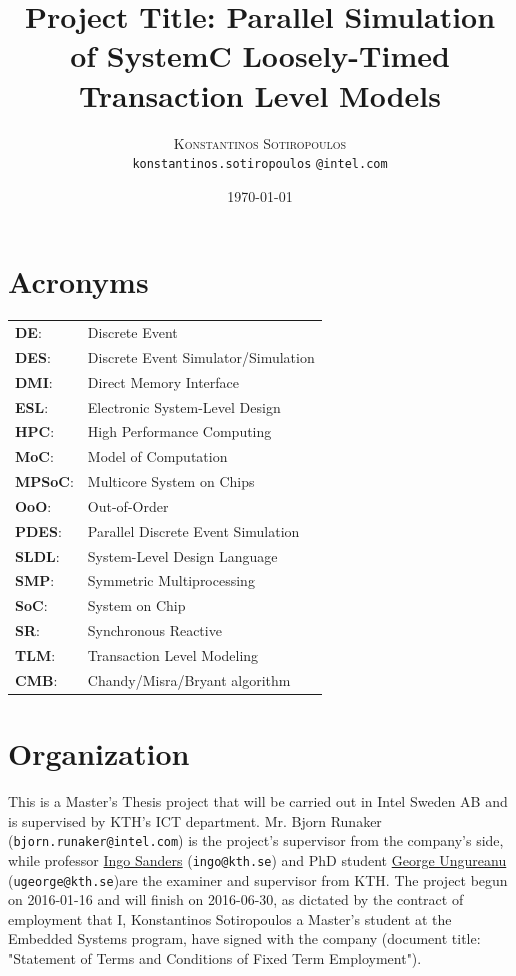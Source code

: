 \documentclass[12pt,twoside]{article}
\date{}
\title{Project Title: Parallel Simulation of SystemC Loosely-Timed Transaction Level Models}
\begin{document}
\author{
        \textsc{Konstantinos Sotiropoulos}
        \mbox{}\\
        \normalsize
            \texttt{konstantinos.sotiropoulos}
        \normalsize
            \texttt{@intel.com}
}

\date{\today}

\maketitle

\tableofcontents

\clearpage

\section{Acronyms}
\label{sec:orgheadline1}
\begin{center}
\begin{tabular}{ll}
\textbf{DE}: & Discrete Event\\
\textbf{DES}: & Discrete Event Simulator/Simulation\\
\textbf{DMI}: & Direct Memory Interface\\
\textbf{ESL}: & Electronic System-Level Design\\
\textbf{HPC}: & High Performance Computing\\
\textbf{MoC}: & Model of Computation\\
\textbf{MPSoC}: & Multicore System on Chips\\
\textbf{OoO}: & Out-of-Order\\
\textbf{PDES}: & Parallel Discrete Event Simulation\\
\textbf{SLDL}: & System-Level Design Language\\
\textbf{SMP}: & Symmetric Multiprocessing\\
\textbf{SoC}: & System on Chip\\
\textbf{SR}: & Synchronous Reactive\\
\textbf{TLM}: & Transaction Level Modeling\\
\textbf{CMB}: & Chandy/Misra/Bryant algorithm\\
\end{tabular}
\end{center}
\clearpage


\section{Organization}
\label{sec:orgheadline2}
This is a Master's Thesis project that will be carried out in Intel Sweden AB and is supervised by KTH's ICT department.
Mr. Bjorn Runaker (\texttt{bjorn.runaker@intel.com}) is the project's supervisor from the company's side, 
while professor \href{https://people.kth.se/~ingo/}{Ingo Sanders} (\texttt{ingo@kth.se}) and PhD student \href{http://people.kth.se/~ugeorge/}{George Ungureanu} (\texttt{ugeorge@kth.se})are the examiner and supervisor from KTH. 
The project begun on 2016-01-16 and will finish on 2016-06-30, as dictated by the contract of employment that I, Konstantinos Sotiropoulos a Master's student at the Embedded Systems program, have signed with the company 
(document title: "Statement of Terms and Conditions of Fixed Term Employment"). 
\end{document}
